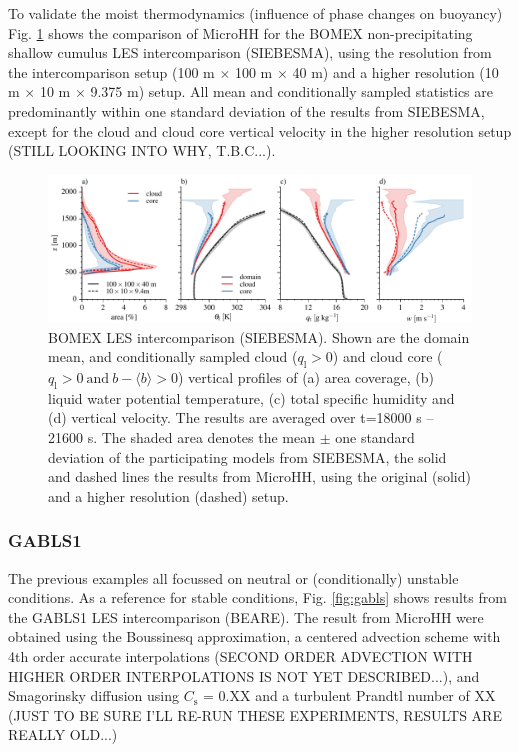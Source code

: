 \documentclass[gmd]{copernicus}
\begin{document}
To validate the moist thermodynamics (influence of phase changes on buoyancy) Fig. \ref{fig:bomex} shows the comparison of MicroHH for the BOMEX non-precipitating shallow cumulus LES intercomparison (SIEBESMA), using the resolution from the intercomparison setup (100 m $\times$ 100 m $\times$ 40 m) and a higher resolution (10 m $\times$ 10 m $\times$ 9.375 m) setup. All mean and conditionally sampled statistics are predominantly within one standard deviation of the results from SIEBESMA, except for the cloud and cloud core vertical velocity in the higher resolution setup (STILL LOOKING INTO WHY, T.B.C...). 

\begin{figure}[t]
\vspace*{2mm}
\begin{center}
\includegraphics[width=16.6cm]{figs/gmd_bomex_profs.pdf}
\end{center}
\caption{BOMEX LES intercomparison (SIEBESMA). Shown are the domain mean, and conditionally sampled cloud ($q_\mathrm{l} > 0$) and cloud core ($q_\mathrm{l}>0 \ \mathrm{and} \ b-\langle b \rangle > 0$) vertical profiles of (a) area coverage, (b) liquid water potential temperature, (c) total specific humidity and (d) vertical velocity. The results are averaged over t=18000 s -- 21600 s. The shaded area denotes the mean $\pm$ one standard deviation of the participating models from SIEBESMA, the solid and dashed lines the results from MicroHH, using the original (solid) and a higher resolution (dashed) setup.}
\label{fig:bomex}
\end{figure}

\subsubsection{GABLS1}

The previous examples all focussed on neutral or (conditionally) unstable conditions. As a reference for stable conditions, Fig. \ref{fig:gabls} shows results from the GABLS1 LES intercomparison (BEARE). The result from MicroHH were obtained using the Boussinesq approximation, a centered advection scheme with 4th order accurate interpolations (SECOND ORDER ADVECTION WITH HIGHER ORDER INTERPOLATIONS IS NOT YET DESCRIBED...), and Smagorinsky diffusion using $C_\mathrm{s}$ = 0.XX and a turbulent Prandtl number of XX (JUST TO BE SURE I'LL RE-RUN THESE EXPERIMENTS, RESULTS ARE REALLY OLD...)
\end{document}
